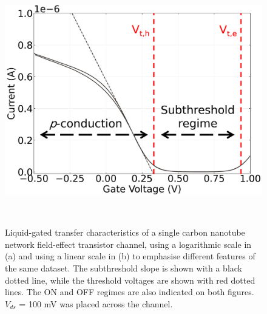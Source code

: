 \documentclass[
  letterpaper,
  DIV=11,
  numbers=noendperiod]{scrartcl}
\begin{document}
\begin{figure}
\begin{minipage}{0.01\linewidth}
~\end{minipage}%
%
\begin{minipage}{0.45\linewidth}
\includegraphics{figures/ch2/CNT_transfer_2.png}\end{minipage}%
%
\begin{minipage}{0.01\linewidth}
~\end{minipage}%

\caption{\label{fig-CNT-characteristics}Liquid-gated transfer
characteristics of a single carbon nanotube network field-effect
transistor channel, using a logarithmic scale in (a) and using a linear
scale in (b) to emphasise different features of the same dataset. The
subthreshold slope is shown with a black dotted line, while the
threshold voltages are shown with red dotted lines. The ON and OFF
regimes are also indicated on both figures. \(V_{ds}\) = 100 mV was
placed across the channel.}

\end{figure}%
\end{document}
